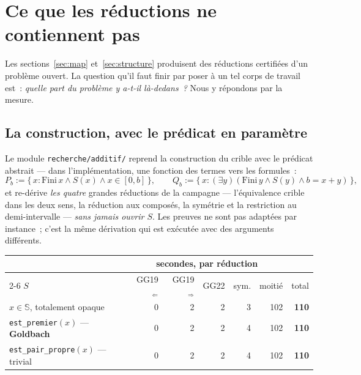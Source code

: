 \documentclass[11pt]{article}
\theoremstyle{remark}\newtheorem{remarque}{Remarque}
\begin{document}
\section{Ce que les réductions ne contiennent pas}
\label{sec:abstract}

Les sections~\ref{sec:map} et~\ref{sec:structure} produisent des réductions certifiées
d'un problème ouvert. La question qu'il faut finir par poser à un tel corps de travail
est~: \emph{quelle part du problème y a-t-il là-dedans~?} Nous y répondons par la mesure.

\subsection{La construction, avec le prédicat en paramètre}

Le module \texttt{recherche/additif/} reprend la construction du crible avec le prédicat
abstrait --- dans l'implémentation, une fonction des termes vers les formules~:
\[
P_b := \{\, x : \mathrm{Fini}\,x \wedge S(x) \wedge x \in [0,b] \,\},
\qquad
Q_b := \{\, x : (\exists y)(\mathrm{Fini}\,y \wedge S(y) \wedge b = x + y) \,\},
\]
et re-dérive \emph{les quatre} grandes réductions de la campagne --- l'équivalence crible
dans les deux sens, la réduction aux composés, la symétrie et la restriction au
demi-intervalle --- \emph{sans jamais ouvrir $S$}. Les preuves ne sont pas adaptées par
instance~; c'est la même dérivation qui est exécutée avec des arguments différents.

\begin{center}
\begin{tabular}{@{}lrrrrrr@{}}
\toprule
& \multicolumn{5}{c}{secondes, par réduction} & \\
\cmidrule(lr){2-6}
$S$ & GG19$_\Leftarrow$ & GG19$_\Rightarrow$ & GG22 & sym. & moitié & total \\
\midrule
$x \in \mathbb{S}$, totalement opaque & 0 & 2 & 2 & 3 & 102 & \textbf{110} \\
\texttt{est\_premier}$(x)$ --- \textbf{Goldbach} & 0 & 2 & 2 & 4 & 102 & \textbf{110} \\
\texttt{est\_pair\_propre}$(x)$ --- trivial & 0 & 2 & 2 & 4 & 102 & \textbf{110} \\
\bottomrule
\end{tabular}
\end{center}
\end{document}
